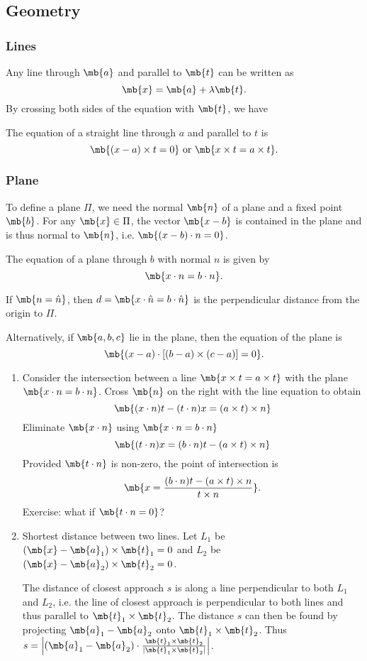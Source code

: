 \documentclass[a4paper]{article}
\begin{document}
\subsection{Geometry}
\subsubsection{Lines}
Any line through $\mb{a}$ and parallel to $\mb{t}$ can be written as
\[
\mb{x} = \mb{a} + \lambda\mb{t}.
\]
By crossing both sides of the equation with $\mb{t}$, we have
\begin{thm} The equation of a straight line through $a$ and parallel to $t$ is
  \[
  \mb{(x - a)\times t = 0}\text{ or }\mb{x\times t = a\times t}.
  \]
\end{thm}
\subsubsection{Plane}
To define a plane $\Pi$, we need the normal $\mb{n}$ of a plane and a fixed point $\mb{b}$.  For any $\mb{x}\in \Pi$, the vector $\mb{x - b}$ is contained in the plane and is thus normal to $\mb{n}$, i.e. $\mb{(x - b)\cdot n = 0}$.
\begin{thm}
  The equation of a plane through $b$ with normal $n$ is given by
  \[
  \mb{x\cdot n = b\cdot n}.
  \]
\end{thm}
If $\mb{n = \hat n}$, then $d = \mb{x\cdot\hat{n} = b\cdot\hat{n}}$ is the perpendicular distance from the origin to $\Pi$.

Alternatively, if $\mb{a, b, c}$ lie in the plane, then the equation of the plane is
\[
\mb{(x - a)\cdot [(b - a)\times (c - a)] = 0}.
\]

\begin{eg}\leavevmode
  \begin{enumerate}
  \item Consider the intersection between a line $\mb{x\times t = a\times t}$ with the plane $\mb{x\cdot n = b\cdot n}$. Cross $\mb{n}$ on the right with the line equation to obtain
    \[
    \mb{(x\cdot n)t - (t\cdot n)x = (a\times t)\times n}
    \]
    Eliminate $\mb{x\cdot n}$ using $\mb{x\cdot n = b\cdot n}$
    \[
    \mb{(t\cdot n)x = (b\cdot n)t - (a\times t)\times n}
    \]
    Provided $\mb{t\cdot n}$ is non-zero, the point of intersection is
    \[
    \mb{x = \frac{(b\cdot n)t - (a\times t)\times n}{t\times n}}.
    \]
    Exercise: what if $\mb{t\cdot n = 0}$?
  \item Shortest distance between two lines. Let $L_1$ be $(\mb{x} - \mb{a}_1)\times \mb{t}_1 = 0$ and $L_2$ be $(\mb{x} - \mb{a}_2)\times \mb{t}_2 = 0$.

    The distance of closest approach $s$ is along a line perpendicular to both $L_1$ and $L_2$, i.e. the line of closest approach is perpendicular to both lines and thus parallel to $\mb{t}_1\times \mb{t}_2$. The distance $s$ can then be found by projecting $\mb{a}_1 - \mb{a}_2$ onto $\mb{t}_1\times \mb{t}_2$. Thus $s = \left|(\mb{a}_1 - \mb{a}_2)\cdot\frac{\mb{t}_1\times \mb{t}_2}{|\mb{t}_1\times \mb{t}_2|}\right|$.
  \end{enumerate}
\end{eg}
\end{document}
